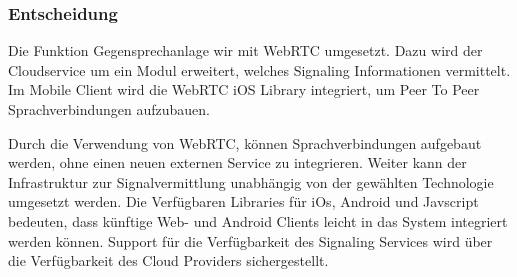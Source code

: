 \subsubsection{Entscheidung}

Die Funktion Gegensprechanlage wir mit WebRTC umgesetzt.
Dazu wird der Cloudservice um ein Modul erweitert, welches Signaling Informationen vermittelt.
Im Mobile Client wird die WebRTC iOS Library integriert, um Peer To Peer Sprachverbindungen aufzubauen.

Durch die Verwendung von WebRTC, können Sprachverbindungen aufgebaut werden, ohne einen neuen externen Service zu integrieren.
Weiter kann der Infrastruktur zur Signalvermittlung unabhängig von der gewählten Technologie umgesetzt werden.
Die Verfügbaren Libraries für iOs, Android und Javscript bedeuten, dass künftige Web- und Android Clients leicht in das System integriert werden können.
Support für die Verfügbarkeit des Signaling Services wird über die Verfügbarkeit des Cloud Providers sichergestellt.

\clearpage
